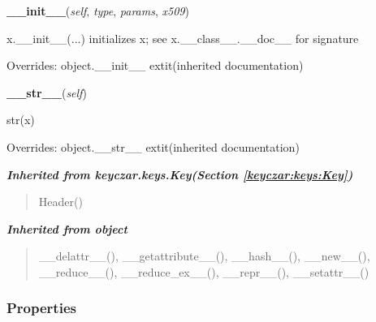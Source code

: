     \vspace{0.5ex}

\hspace{.8\funcindent}\begin{boxedminipage}{\funcwidth}

    \raggedright \textbf{\_\_init\_\_}(\textit{self}, \textit{type}, \textit{params}, \textit{x509})

\setlength{\parskip}{2ex}
    x.\_\_init\_\_(...) initializes x; see x.\_\_class\_\_.\_\_doc\_\_ for 
    signature

\setlength{\parskip}{1ex}
      Overrides: object.\_\_init\_\_ 	extit{(inherited documentation)}

    \end{boxedminipage}

    \vspace{0.5ex}

\hspace{.8\funcindent}\begin{boxedminipage}{\funcwidth}

    \raggedright \textbf{\_\_str\_\_}(\textit{self})

\setlength{\parskip}{2ex}
    str(x)

\setlength{\parskip}{1ex}
      Overrides: object.\_\_str\_\_ 	extit{(inherited documentation)}

    \end{boxedminipage}


\large{\textbf{\textit{Inherited from keyczar.keys.Key\textit{(Section \ref{keyczar:keys:Key})}}}}

\begin{quote}
Header()
\end{quote}

\large{\textbf{\textit{Inherited from object}}}

\begin{quote}
\_\_delattr\_\_(), \_\_getattribute\_\_(), \_\_hash\_\_(), \_\_new\_\_(), \_\_reduce\_\_(), \_\_reduce\_ex\_\_(), \_\_repr\_\_(), \_\_setattr\_\_()
\end{quote}


  \subsubsection{Properties}


